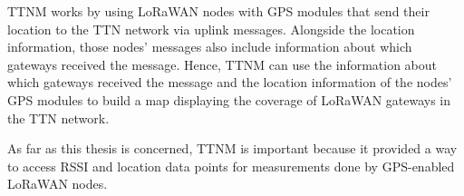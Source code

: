 \acl{TTNM} works by using \ac{LoRaWAN} nodes with \ac{GPS} modules that send their location to the \ac{TTN} network via uplink messages.
Alongside the location information, those nodes' messages also include information about which gateways received the message.
Hence, \acl{TTNM} can use the information about which gateways received the message and the location information of the nodes' \ac{GPS} modules to build a map displaying the coverage of \ac{LoRaWAN} gateways in the \ac{TTN} network.


As far as this thesis is concerned, \acl{TTNM} is important because it provided a way to access \ac{RSSI} and location data points for measurements done by \ac{GPS}-enabled \ac{LoRaWAN} nodes.